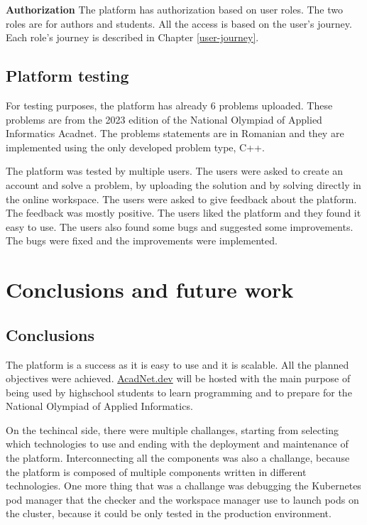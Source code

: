 \documentclass[12pt,a4paper]{report}
\begin{document}
\textbf{Authorization}
The platform has authorization based on user roles. The two roles are for authors and students. All the access is based on the user's journey. Each role's journey is described in Chapter \ref{user-journey}.

\section{Platform testing}
For testing purposes, the platform has already 6 problems uploaded. These problems are from the 2023 edition of the National Olympiad of Applied Informatics Acadnet. The problems statements are in Romanian and they are implemented using the only developed problem type, C++.

The platform was tested by multiple users. The users were asked to create an account and solve a problem, by uploading the solution and by solving directly in the online workspace. The users were asked to give feedback about the platform. The feedback was mostly positive. The users liked the platform and they found it easy to use. The users also found some bugs and suggested some improvements. The bugs were fixed and the improvements were implemented.


\chapter{Conclusions and future work}
\section{Conclusions}
The platform is a success as it is easy to use and it is scalable. All the planned objectives were achieved. \href{https://acadnet.dev}{AcadNet.dev} will be hosted with the main purpose of being used by highschool students to learn programming and to prepare for the National Olympiad of Applied Informatics.

On the techincal side, there were multiple challanges, starting from selecting which technologies to use and ending with the deployment and maintenance of the platform. Interconnecting all the components was also a challange, because the platform is composed of multiple components written in different technologies. One more thing that was a challange was debugging the Kubernetes pod manager that the checker and the workspace manager use to launch pods on the cluster, because it could be only tested in the production environment.
\end{document}
